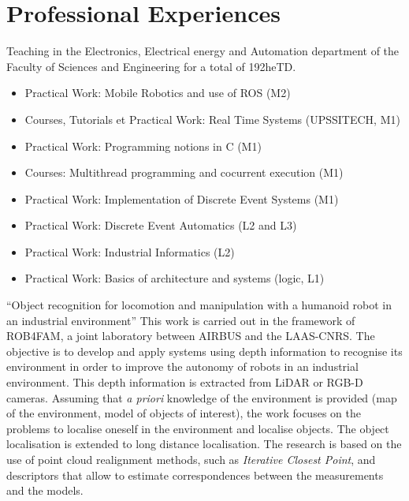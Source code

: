 \documentclass[11pt,a4paper,sans]{moderncv}         %
\begin{document}
\section{Professional Experiences}
{
Teaching in the Electronics, Electrical energy and Automation department of the Faculty of Sciences and Engineering for a total of 192heTD.
\begin{itemize}
  \item Practical Work: Mobile Robotics and use of ROS (M2)
  \item Courses, Tutorials et Practical Work: Real Time Systems (UPSSITECH, M1)
  \item Practical Work: Programming notions in C (M1)
  \item Courses: Multithread programming and cocurrent execution (M1)
  \item Practical Work: Implementation of Discrete Event Systems (M1)
  \item Practical Work: Discrete Event Automatics (L2 and L3)
  \item Practical Work: Industrial Informatics (L2)
  \item Practical Work: Basics of architecture and systems (logic, L1)
\end{itemize}
}
{``Object recognition for locomotion and manipulation with a humanoid robot in an industrial environment''}
{
This work is carried out in the framework of ROB4FAM, a joint laboratory between AIRBUS and the LAAS-CNRS.
The objective is to develop and apply systems using depth information to recognise its environment in order to improve the autonomy of robots in an industrial environment.
This depth information is extracted from LiDAR or RGB-D cameras.
Assuming that \emph{a priori} knowledge of the environment is provided (map of the environment, model of objects of interest), the work focuses on the problems to localise oneself in the environment and localise objects.
The object localisation is extended to long distance localisation.
The research is based on the use of point cloud realignment methods, such as \emph{Iterative Closest Point}, and descriptors that allow to estimate correspondences between the measurements and the models.
}
%
\end{document}
